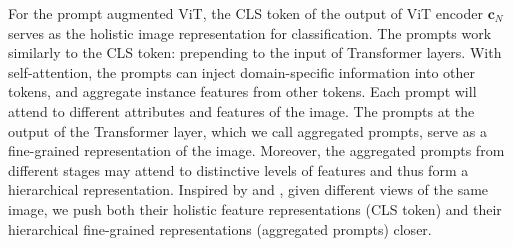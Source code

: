 \documentclass{article} \usepackage{iclr2023_conference,times}
\def\vc{{\bm{c}}}
\begin{document}
For the prompt augmented ViT, the CLS token of the output of ViT encoder $\displaystyle \vc_N$ serves as the holistic image representation for classification. The prompts work similarly to the CLS token: prepending to the input of Transformer layers. With self-attention, the prompts can inject domain-specific information into other tokens, and aggregate instance features from other tokens. Each prompt will attend to different attributes and features of the image. The prompts at the output of the Transformer layer, which we call aggregated prompts, serve as a fine-grained representation of the image. Moreover, the aggregated prompts from different stages may attend to distinctive levels of features and thus form a hierarchical representation. Inspired by \citet{caron2021emerging} and \citet{grill2020bootstrap}, given different views of the same image, we push both their holistic feature representations (CLS token) and their hierarchical fine-grained representations (aggregated prompts) closer.
\end{document}
